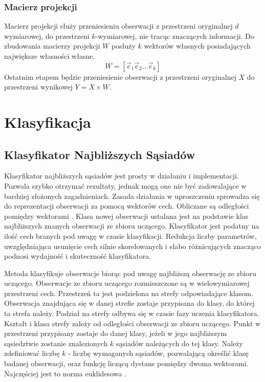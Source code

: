 \documentclass[a4paper,12pt,twoside,openany]{report}
\begin{document}
\subsubsection{Macierz projekcji}
Macierz projekcji służy przeniesieniu obserwacji z przestrzeni oryginalnej $d$ wymiarowej,
do przestrzeni $k$-wymiarowej, nie tracąc znaczących informacji.
Do zbudowania macierzy projekcji $W$ posłuży $k$ wektorów własnych posiadających największe własności własne.
\begin{equation}
	W = [\vec e_1 \vec e_2 \dots \vec e_k]
\end{equation}
Ostatnim etapem będzie przeniesienie obserwacji z przestrzeni oryginalnej $X$ do przestrzeni wynikowej $Y = X \times W$.
\section{Klasyfikacja}
\subsection{Klasyfikator Najbliższych Sąsiadów}
Klasyfikator najbliższych sąsiadów jest prosty w działaniu i implementacji.
Pozwala szybko otrzymać rezultaty, jednak mogą one nie być zadowalające w bardziej złożonych zagadnieniach.
Zasada działania w uproszczeniu sprowadza się do reprezentacji obserwacji za pomocą wektorów cech.
Obliczane są odległości pomiędzy wektorami \cite{Du2013}.
Klasa nowej obserwacji ustalana jest na podstawie klas najbliższych znanych obserwacji ze zbioru uczącego.
Klasyfikator jest podatny na ilość cech branych pod uwagę w czasie klasyfikacji.
Redukcja liczby parametrów, uwzględniająca usunięcie cech silnie skorelowanych i słabo różnicujących znacząco podnosi wydajność i skuteczność klasyfikatora.

Metoda klasyfikuje obserwacje biorąc pod uwagę najbliższą obserwację ze zbioru uczącego.
Obserwacje ze zbioru uczącego rozmieszczone są w wielowymiarowej przestrzeni cech.
Przestrzeń ta jest podzielona na strefy odpowiadające klasom.
Obserwacja znajdująca się w danej strefie zostaje przypisana do klasy, do której ta strefa należy.
Podział na strefy odbywa się w czasie fazy uczenia klasyfikatora.
Kształt i klasa strefy zależy od odległości obserwacji ze zbioru uczącego.
Punkt w przestrzeni przypisany zostaje do danej klasy, jeżeli w jego najbliższym sąsiedztwie zostanie znalezionych $k$ sąsiadów należących do tej klasy.
Należy zdefiniować liczbę $k$ - liczbę wymaganych sąsiadów, pozwalającą określić klasę badanej obserwacji, 
oraz funkcję liczącą dystans pomiędzy dwoma wektorami. Najczęściej jest to norma euklidesowa \cite{Martin2011}.
\end{document}

